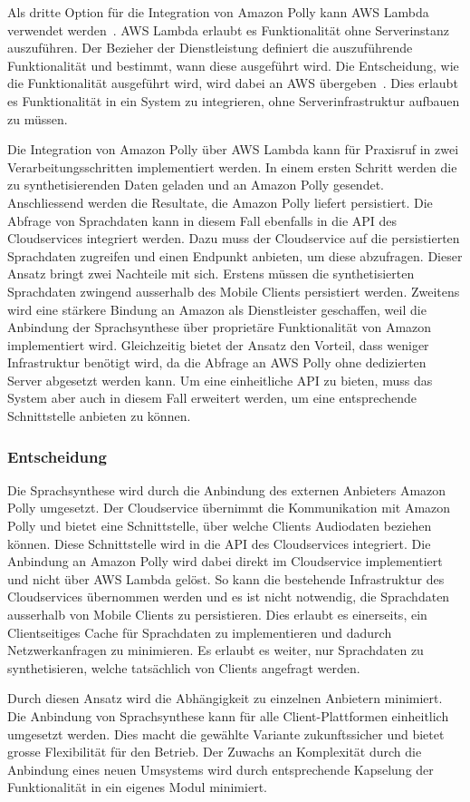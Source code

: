 Als dritte Option für die Integration von Amazon Polly kann AWS Lambda verwendet werden~\cite{aws_polly}.
AWS Lambda erlaubt es Funktionalität ohne Serverinstanz auszuführen.
Der Bezieher der Dienstleistung definiert die auszuführende Funktionalität und bestimmt, wann diese ausgeführt wird.
Die Entscheidung, wie die Funktionalität ausgeführt wird, wird dabei an AWS übergeben~\cite{aws_lambda}.
Dies erlaubt es Funktionalität in ein System zu integrieren, ohne Serverinfrastruktur aufbauen zu müssen.

Die Integration von Amazon Polly über AWS Lambda kann für Praxisruf in zwei Verarbeitungsschritten implementiert werden.
In einem ersten Schritt werden die zu synthetisierenden Daten geladen und an Amazon Polly gesendet.
Anschliessend werden die Resultate, die Amazon Polly liefert persistiert.
Die Abfrage von Sprachdaten kann in diesem Fall ebenfalls in die API des Cloudservices integriert werden.
Dazu muss der Cloudservice auf die persistierten Sprachdaten zugreifen und einen Endpunkt anbieten, um diese abzufragen.
Dieser Ansatz bringt zwei Nachteile mit sich.
Erstens müssen die synthetisierten Sprachdaten zwingend ausserhalb des Mobile Clients persistiert werden.
Zweitens wird eine stärkere Bindung an Amazon als Dienstleister geschaffen, weil die Anbindung der Sprachsynthese über proprietäre Funktionalität von Amazon implementiert wird.
Gleichzeitig bietet der Ansatz den Vorteil, dass weniger Infrastruktur benötigt wird, da die Abfrage an AWS Polly ohne dedizierten Server abgesetzt werden kann.
Um eine einheitliche API zu bieten, muss das System aber auch in diesem Fall erweitert werden, um eine entsprechende Schnittstelle anbieten zu können.

\subsubsection{Entscheidung}

Die Sprachsynthese wird durch die Anbindung des externen Anbieters Amazon Polly umgesetzt.
Der Cloudservice übernimmt die Kommunikation mit Amazon Polly und bietet eine Schnittstelle, über welche Clients Audiodaten beziehen können.
Diese Schnittstelle wird in die API des Cloudservices integriert.
Die Anbindung an Amazon Polly wird dabei direkt im Cloudservice implementiert und nicht über AWS Lambda gelöst.
So kann die bestehende Infrastruktur des Cloudservices übernommen werden und es ist nicht notwendig, die Sprachdaten ausserhalb von Mobile Clients zu persistieren.
Dies erlaubt es einerseits, ein Clientseitiges Cache für Sprachdaten zu implementieren und dadurch Netzwerkanfragen zu minimieren.
Es erlaubt es weiter, nur Sprachdaten zu synthetisieren, welche tatsächlich von Clients angefragt werden.

Durch diesen Ansatz wird die Abhängigkeit zu einzelnen Anbietern minimiert.
Die Anbindung von Sprachsynthese kann für alle Client-Plattformen einheitlich umgesetzt werden.
Dies macht die gewählte Variante zukunftssicher und bietet grosse Flexibilität für den Betrieb.
Der Zuwachs an Komplexität durch die Anbindung eines neuen Umsystems wird durch entsprechende Kapselung der Funktionalität in ein eigenes Modul minimiert.

\clearpage
